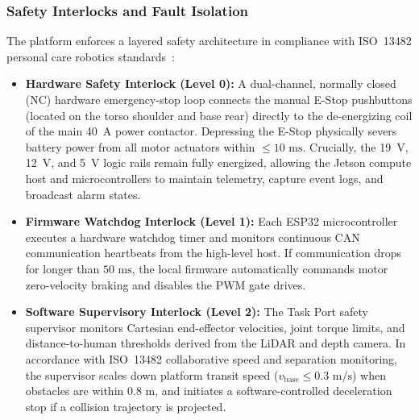 \subsubsection{Safety Interlocks and Fault Isolation}
The platform enforces a layered safety architecture in compliance with ISO~13482 personal care robotics standards~\cite{iso13482}:
\begin{itemize}[leftmargin=1.5em]
  \item \textbf{Hardware Safety Interlock (Level 0):} A dual-channel, normally closed (NC) hardware emergency-stop loop connects the manual E-Stop pushbuttons (located on the torso shoulder and base rear) directly to the de-energizing coil of the main 40~A power contactor. Depressing the E-Stop physically severs battery power from all motor actuators within $\le 10\text{ ms}$. Crucially, the 19~V, 12~V, and 5~V logic rails remain fully energized, allowing the Jetson compute host and microcontrollers to maintain telemetry, capture event logs, and broadcast alarm states.
  \item \textbf{Firmware Watchdog Interlock (Level 1):} Each ESP32 microcontroller executes a hardware watchdog timer and monitors continuous CAN communication heartbeats from the high-level host. If communication drops for longer than $50\text{ ms}$, the local firmware automatically commands motor zero-velocity braking and disables the PWM gate drives.
  \item \textbf{Software Supervisory Interlock (Level 2):} The Task Port safety supervisor monitors Cartesian end-effector velocities, joint torque limits, and distance-to-human thresholds derived from the LiDAR and depth camera. In accordance with ISO~13482 collaborative speed and separation monitoring, the supervisor scales down platform transit speed ($v_{\text{base}} \le 0.3\text{ m/s}$) when obstacles are within $0.8\text{ m}$, and initiates a software-controlled deceleration stop if a collision trajectory is projected.
\end{itemize}
